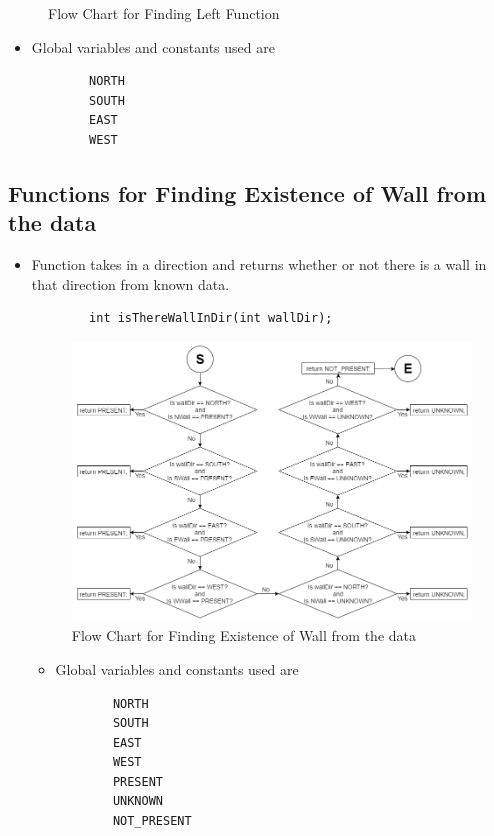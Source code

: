 \documentclass[11pt]{article}
\begin{document}
\begin{itemize}
\begin{figure}[htp]
\caption{Flow Chart for Finding Left Function}
\label{}
\end{figure}
	\begin{itemize}
	\item Global variables and constants used are
	\begin{verbatim}
		NORTH
		SOUTH
		EAST
		WEST
	\end{verbatim}
	\end{itemize}
\end{itemize}
\newpage


\subsection{Functions for Finding Existence of Wall from the data}
\begin{itemize}
\item Function takes in a direction and returns whether or not there is a wall in that direction from known data.
	\begin{verbatim}
		int isThereWallInDir(int wallDir);
	\end{verbatim}
\begin{figure}[htp]
\centering
\includegraphics[scale=0.580]{images/Software_Flowchart/isThereWallInDir.png}
\caption{Flow Chart for Finding Existence of Wall from the data}
\label{}
\end{figure}
	\begin{itemize}
	\item Global variables and constants used are
	\begin{verbatim}
		NORTH
		SOUTH
		EAST
		WEST
		PRESENT
		UNKNOWN
		NOT_PRESENT
	\end{verbatim}
	\end{itemize}
\end{itemize}
\newpage
\end{document}
